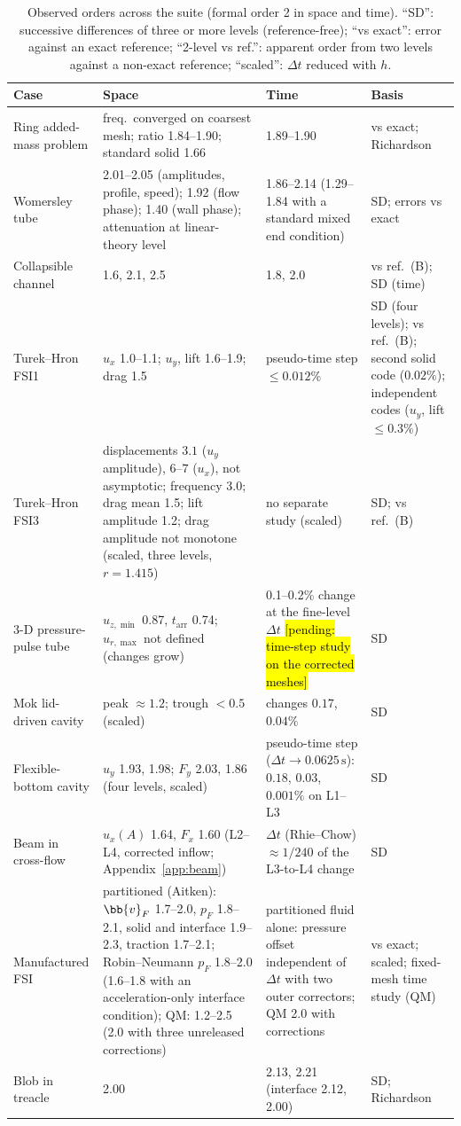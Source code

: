 \begin{table}[htbp]
	\centering
	\footnotesize
	\setlength{\tabcolsep}{3pt}
	\caption{Observed orders across the suite (formal order 2 in space and time). ``SD'': successive differences of three or more levels (reference-free); ``vs exact'': error against an exact reference; ``2-level vs ref.'': apparent order from two levels against a non-exact reference; ``scaled'': $\Delta t$ reduced with $h$.}
	\label{tab:orders}
	\begin{tabular}{p{3.0cm}p{4.6cm}p{3.4cm}p{2.8cm}}
		\toprule
		Case & Space & Time & Basis \\
		\midrule
		Ring added-mass problem & freq.\ converged on coarsest mesh; ratio 1.84--1.90; standard solid 1.66 & 1.89--1.90 & vs exact; Richardson \\
		Womersley tube & 2.01--2.05 (amplitudes, profile, speed); 1.92 (flow phase); 1.40 (wall phase); attenuation at linear-theory level & 1.86--2.14 (1.29--1.84 with a standard mixed end condition) & SD; errors vs exact \\
		Collapsible channel & 1.6, 2.1, 2.5 & 1.8, 2.0 & vs ref.\ (B); SD (time) \\
		Turek--Hron FSI1 & $u_x$ 1.0--1.1; $u_y$, lift 1.6--1.9; drag 1.5 & pseudo-time step $\leq0.012\%$ & SD (four levels); vs ref.\ (B); second solid code ($0.02\%$); independent codes ($u_y$, lift $\leq0.3\%$) \\
		Turek--Hron FSI3 & displacements $3.1$ ($u_y$ amplitude), $6$--$7$ ($u_x$), not asymptotic; frequency 3.0; drag mean 1.5; lift amplitude 1.2; drag amplitude not monotone (scaled, three levels, $r = 1.415$) & no separate study (scaled) & SD; vs ref.\ (B) \\
		3-D pressure-pulse tube & $u_{z,\min}$ 0.87, $t_\mathrm{arr}$ 0.74; $u_{r,\max}$ not defined (changes grow) & 0.1--0.2\% change at the fine-level $\Delta t$ \hl{[pending: time-step study on the corrected meshes]} & SD \\
		Mok lid-driven cavity & peak $\approx1.2$; trough $<0.5$ (scaled) & changes $0.17$, $0.04\%$ & SD \\
		Flexible-bottom cavity & $u_y$ 1.93, 1.98; $F_y$ 2.03, 1.86 (four levels, scaled) & pseudo-time step ($\Delta t \to 0.0625\,\mathrm{s}$): $0.18$, $0.03$, $0.001\%$ on L1--L3 & SD \\
		Beam in cross-flow & $u_x(A)$ 1.64, $F_x$ 1.60 (L2--L4, corrected inflow; Appendix~\ref{app:beam}) & $\Delta t$ (Rhie--Chow) $\approx1/240$ of the L3-to-L4 change & SD \\
		Manufactured FSI & partitioned (Aitken): $\bb{v}_F$ 1.7--2.0, $p_F$ 1.8--2.1, solid and interface 1.9--2.3, traction 1.7--2.1; Robin--Neumann $p_F$ 1.8--2.0 (1.6--1.8 with an acceleration-only interface condition); QM: 1.2--2.5 (2.0 with three unreleased corrections) & partitioned fluid alone: pressure offset independent of $\Delta t$ with two outer correctors; QM 2.0 with corrections & vs exact; scaled; fixed-mesh time study (QM) \\
		Blob in treacle & 2.00 & 2.13, 2.21 (interface 2.12, 2.00) & SD; Richardson \\
		\bottomrule
	\end{tabular}
\end{table}

